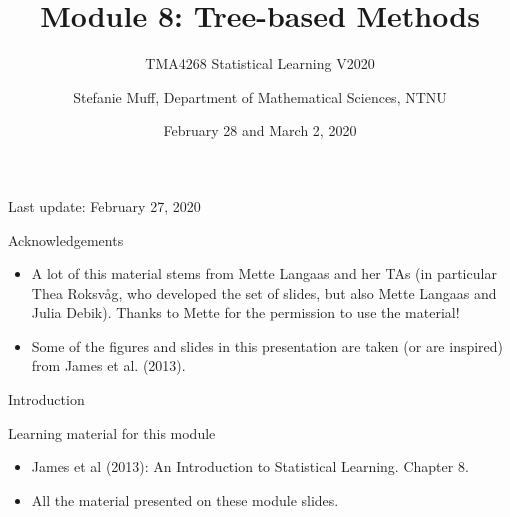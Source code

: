 \documentclass[10pt,ignorenonframetext,]{beamer}
\title{Module 8: Tree-based Methods}
\subtitle{TMA4268 Statistical Learning V2020}
\author{Stefanie Muff, Department of Mathematical Sciences, NTNU}
\date{February 28 and March 2, 2020}
\providecommand{\tightlist}{%
  \setlength{\itemsep}{0pt}\setlength{\parskip}{0pt}}
\begin{document}
\frame{\titlepage}

\begin{frame}

Last update: February 27, 2020

\end{frame}

\begin{frame}{Acknowledgements}

\begin{itemize}
\item
  A lot of this material stems from Mette Langaas and her TAs (in
  particular Thea Roksv\aa g, who developed the set of slides, but also
  Mette Langaas and Julia Debik). Thanks to Mette for the permission to
  use the material!
\item
  Some of the figures and slides in this presentation are taken (or are
  inspired) from James et al. (2013).
\end{itemize}

\end{frame}

\begin{frame}{Introduction}

\begin{block}{Learning material for this module}

\vspace{2mm}

\begin{itemize}
\tightlist
\item
  James et al (2013): An Introduction to Statistical Learning. Chapter
  8.\\
\item
  All the material presented on these module slides.
\end{itemize}

\end{block}

\end{frame}
\end{document}
